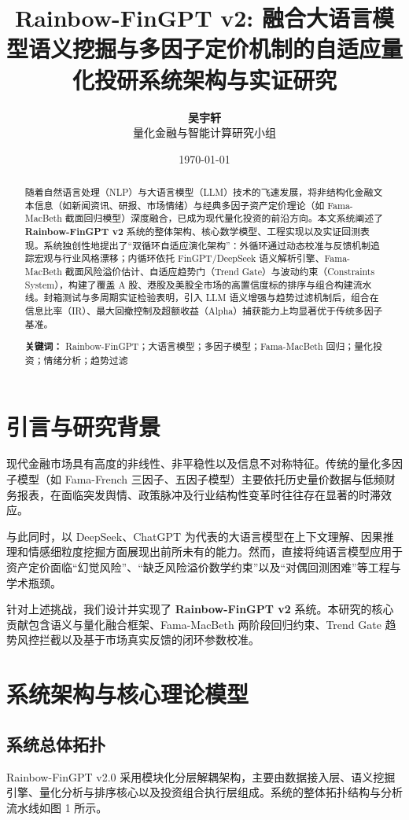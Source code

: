 \documentclass[11pt,a4paper]{article}
\title{\LARGE \textbf{Rainbow-FinGPT v2: 融合大语言模型语义挖掘与多因子定价机制的自适应量化投研系统架构与实证研究}}
\author{\textbf{吴宇轩}\\[2mm] \small 量化金融与智能计算研究小组}
\date{\today}
\begin{document}
\maketitle

\begin{abstract}
随着自然语言处理（NLP）与大语言模型（LLM）技术的飞速发展，将非结构化金融文本信息（如新闻资讯、研报、市场情绪）与经典多因子资产定价理论（如 Fama-MacBeth 截面回归模型）深度融合，已成为现代量化投资的前沿方向。本文系统阐述了 \textbf{Rainbow-FinGPT v2} 系统的整体架构、核心数学模型、工程实现以及实证回测表现。系统独创性地提出了“双循环自适应演化架构”：外循环通过动态校准与反馈机制追踪宏观与行业风格漂移；内循环依托 FinGPT/DeepSeek 语义解析引擎、Fama-MacBeth 截面风险溢价估计、自适应趋势门（Trend Gate）与波动约束（Constraints System），构建了覆盖 A 股、港股及美股全市场的高置信度标的排序与组合构建流水线。封箱测试与多周期实证检验表明，引入 LLM 语义增强与趋势过滤机制后，组合在信息比率（IR）、最大回撤控制及超额收益（Alpha）捕获能力上均显著优于传统多因子基准。

\vspace{2mm}
\noindent \textbf{关键词：} Rainbow-FinGPT；大语言模型；多因子模型；Fama-MacBeth 回归；量化投资；情绪分析；趋势过滤
\end{abstract}

\section{引言与研究背景}
现代金融市场具有高度的非线性、非平稳性以及信息不对称特征。传统的量化多因子模型（如 Fama-French 三因子、五因子模型）主要依托历史量价数据与低频财务报表，在面临突发舆情、政策脉冲及行业结构性变革时往往存在显著的时滞效应。

与此同时，以 DeepSeek、ChatGPT 为代表的大语言模型在上下文理解、因果推理和情感细粒度挖掘方面展现出前所未有的能力。然而，直接将纯语言模型应用于资产定价面临“幻觉风险”、“缺乏风险溢价数学约束”以及“对偶回测困难”等工程与学术瓶颈。

针对上述挑战，我们设计并实现了 \textbf{Rainbow-FinGPT v2} 系统。本研究的核心贡献包含语义与量化融合框架、Fama-MacBeth 两阶段回归约束、Trend Gate 趋势风控拦截以及基于市场真实反馈的闭环参数校准。

\section{系统架构与核心理论模型}

\subsection{系统总体拓扑}
Rainbow-FinGPT v2.0 采用模块化分层解耦架构，主要由数据接入层、语义挖掘引擎、量化分析与排序核心以及投资组合执行层组成。系统的整体拓扑结构与分析流水线如图 1 所示。
\end{document}
